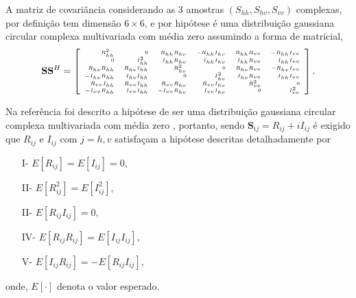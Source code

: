 A matriz de covariância considerando as 3 amostras $(S_{hh}, S_{hv}, S_{vv})$ complexas, por definição tem dimensão $6 \times 6$, e por hipótese é uma distribuição gaussiana circular complexa multivariada com média zero assumindo a forma de matricial,  
\begin{equation*}
\tiny
\mathbf{S} \mathbf{S}^H= \left[
\begin{array}{rrrrrr}
	R_{hh}^2       & 0            &R_{hh}R_{hv}  &-R_{hh}I_{hv} &R_{hh}R_{vv} &-R_{hh}I_{vv}    \\
    0              & I_{hh}^2     &I_{hh}R_{hv}  &I_{hh}I_{hv}  &I_{hh}R_{vv}  &I_{hh}I_{vv}   \\
	R_{hv}R_{hh}   & R_{hv}I_{hh} &R_{hv}^2      & 0            &R_{hv}R_{vv}  &-R_{hv}I_{vv}     \\
	-I_{hv}R_{hh}  & I_{hv}I_{hh} &0             &I_{hv}^2      &I_{hv}R_{vv}  &I_{hh}I_{vv} \\
    R_{vv}I_{hh}   & R_{vv}I_{hh} &R_{vv}R_{hv}  &R_{vv}I_{hv}  &R_{vv}^2      &0            \\
	-I_{vv}R_{hh}  & I_{vv}I_{hh} &-I_{vv}R_{hv} &I_{vv}I_{hv}  &0             &I_{vv}^2     \\
\end{array}
\right].
\end{equation*}

Na referência \cite{good} foi descrito a hipótese de ser uma distribuição gaussiana circular complexa multivariada com média zero , portanto, sendo $\mathbf{S}_{ij}= R_{ij}+ i I_{ij}$ é exigido que $R_{ij}$ e $I_{ij}$ com $j=h,v$ satisfaçam a hipótese descritas detalhadamente por 
\begin{itemize}
	\item[I-] $E[R_{ij}]=E[I_{ij}]=0,$
	\item[II-] $E[R_{ij}^2]=E[I_{ij}^2],$ 
	\item[II-] $E[R_{ij}I_{ij}]=0,$  
	\item[IV-] $E[R_{ij}R_{ij}]=E[I_{ij}I_{ij}],$ 
	\item[V-] $E[I_{ij}R_{ij}]=-E[R_{ij}I_{ij}],$
\end{itemize}
onde, $E[\cdot]$ denota o valor esperado. 

